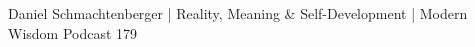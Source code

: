 



\begin{frame}[fragile]\frametitle{}
\begin{center}
{\Large Daniel Schmachtenberger | Reality, Meaning \& Self-Development | Modern Wisdom Podcast 179}

\end{center}
\end{frame}
